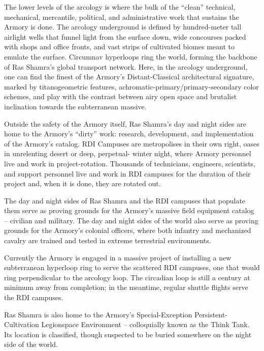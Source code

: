 The lower levels of the arcology is where the bulk of the “clean” technical, mechanical, mercantile,  
political, and administrative work that sustains the Armory is done. The arcology underground is  
defined by hundred-meter tall airlight wells that funnel light from the surface down, wide  
concourses packed with shops and office fronts, and vast strips of cultivated biomes meant to  
emulate the surface. Circumnav hyperloops ring the world, forming the backbone of Ras  
Shamra’s global transport network. Here, in the arcology underground, one can find the finest of  
the Armory’s Distant-Classical architectural signature, marked by titanogeometric features,  
achromatic-primary/primary-secondary color schemes, and play with the contrast between airy  
open space and brutalist inclination towards the subterranean massive.   

Outside the safety of the Armory itself, Ras Shamra’s day and night sides are home to the  
Armory’s “dirty” work: research, development, and implementation of the Armory’s catalog. RDI  
Campuses are metropolises in their own right, oases in unrelenting desert or deep, perpetual- 
winter night, where Armory personnel live and work in project-rotation. Thousands of technicians,  
engineers, scientists, and support personnel live and work in RDI campuses for the duration of  
their project and, when it is done, they are rotated out.   

                                                                                                           


The day and night sides of Ras Shamra and the RDI campuses that populate them serve as  
proving grounds for the Armory’s massive field equipment catalog -- civilian and military. The day  
and night sides of the world also serve as proving grounds for the Armory’s colonial officers,  
where both infantry and mechanized cavalry are trained and tested in extreme terrestrial  
environments.    

Currently the Armory is engaged in a massive project of installing a new subterranean hyperloop  
ring to serve the scattered RDI campuses, one that would ring perpendicular to the arcology loop.  
The circadian loop is still a century at minimum away from completion; in the meantime, regular  
shuttle flights serve the RDI campuses.   

Ras Shamra is also home to the Armory’s Special-Exception Persistent-Cultivation Legionspace  
Environment -- colloquially known as the Think Tank. Its location is classified, though suspected to  
be buried somewhere on the night side of the world.   

